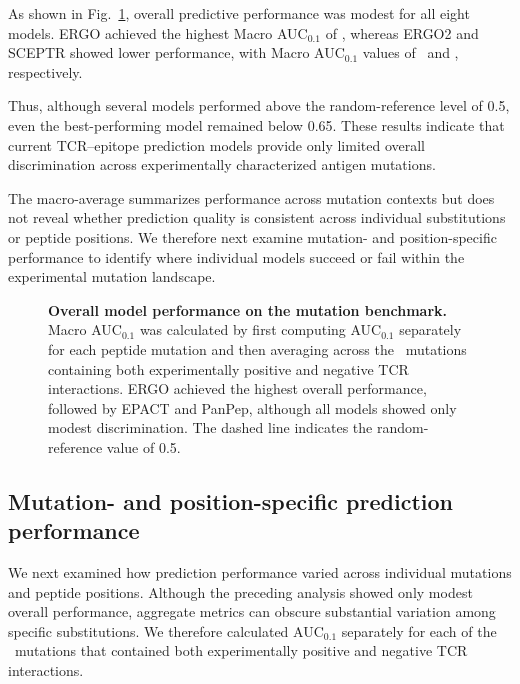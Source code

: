 \documentclass{article}
\begin{document}
As shown in Fig.~\ref{fig:overall_model_performance}, overall predictive
performance was modest for all eight models. ERGO achieved the highest
Macro AUC$_{0.1}$ of \valMacroAucERGO, whereas
ERGO2 and SCEPTR showed lower performance, with Macro AUC$_{0.1}$ values
of \valMacroAucERGOtwo\ and \valMacroAucSCEPTR, respectively.

Thus, although several models performed above the random-reference level
of 0.5, even the best-performing model remained below 0.65. These results
indicate that current TCR--epitope prediction models provide only limited
overall discrimination across experimentally characterized antigen
mutations.

The macro-average summarizes performance across mutation contexts but does
not reveal whether prediction quality is consistent across individual
substitutions or peptide positions. We therefore next examine
mutation- and position-specific performance to identify where individual
models succeed or fail within the experimental mutation landscape.



\begin{figure}[!htbp]
\centering

%

\caption{
\textbf{Overall model performance on the mutation benchmark.}
Macro AUC$_{0.1}$ was calculated by first computing
AUC$_{0.1}$ separately for each peptide mutation and then averaging
across the \valNeligible\ mutations containing both experimentally positive and
negative TCR interactions. ERGO achieved the highest overall
performance, followed by EPACT and PanPep, although all models showed
only modest discrimination. The dashed line indicates the
random-reference value of 0.5.
}
\label{fig:overall_model_performance}

\end{figure}
\subsection{Mutation- and position-specific prediction performance}

We next examined how prediction performance varied across individual
mutations and peptide positions. Although the preceding analysis showed
only modest overall performance, aggregate metrics can obscure substantial
variation among specific substitutions. We therefore calculated
AUC$_{0.1}$ separately for each of the \valNeligible\ mutations that contained both
experimentally positive and negative TCR interactions.
\end{document}
